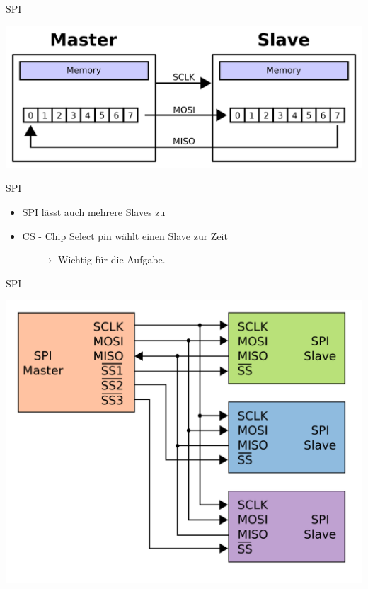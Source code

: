 \documentclass[aspectratio=169,presentation]{beamer}
\begin{document}
\begin{frame} {SPI}
  \begin{center}
    \includegraphics[width=\textwidth]{SPI-transfer}
  \end{center}
\end{frame}

\begin{frame} {SPI}
  \begin{itemize}
    \item SPI lässt auch mehrere Slaves zu
    \item CS - Chip Select pin wählt einen Slave zur Zeit
    \begin{itemize}
      \item[$\rightarrow$] Wichtig für die Aufgabe.
    \end{itemize}
  \end{itemize}
\end{frame}

\begin{frame} {SPI}
  \begin{center}
    \includegraphics[height=.8\textheight]{SPI-parallel}    
  \end{center}
\end{frame}
\end{document}
